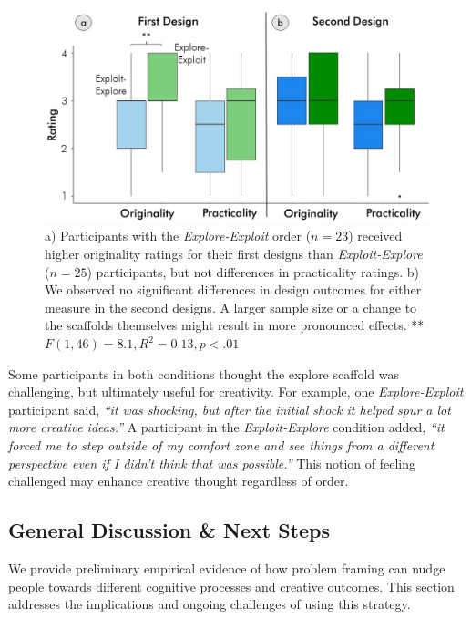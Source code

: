 \begin{figure}
\centering
  \includegraphics[width=.9\textwidth]{future/figures/order.jpg}
  \caption[a) Participants with the \textit{Explore-Exploit} order ($n=23$) received higher originality ratings for their first designs than \textit{Exploit-Explore} ($n=25$) participants, but not differences in practicality ratings.]{a) Participants with the \textit{Explore-Exploit} order ($n=23$) received higher originality ratings for their first designs than \textit{Exploit-Explore} ($n=25$) participants, but not differences in practicality ratings. b) We observed no significant differences in design outcomes for either measure in the second designs. A larger sample size or a change to the scaffolds themselves might result in more pronounced effects. **$F(1,46)=8.1, R^2=0.13, p<.01$
}
  \label{fig:order}
\end{figure}

Some participants in both conditions thought the explore scaffold was challenging, but ultimately useful for creativity. For example, one \textit{Explore-Exploit} participant said, \textit{``it was shocking, but after the initial shock it helped spur a lot more creative ideas.''} A participant in the \textit{Exploit-Explore} condition added, \textit{``it forced me to step outside of my comfort zone and see things from a different perspective even if I didn't think that was possible.''} This notion of feeling challenged may enhance creative thought regardless of order. 
\subsection{General Discussion \& Next Steps}
We provide preliminary empirical evidence of how problem framing can nudge people towards different cognitive processes and creative outcomes. This section addresses the implications and ongoing challenges of using this strategy.

